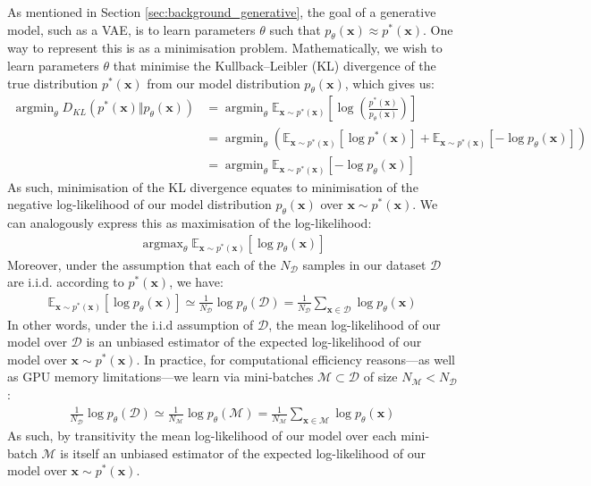 \documentclass[ oneside,%
                    author={George Herbert},
                    degree={MSci},
                     title={Video Diffusion Models for Climate Simulations},
                  subtitle={}]{dissertation}
\begin{document}
As mentioned in Section \ref{sec:background_generative}, the goal of a generative model, such as a VAE, is to learn parameters $\theta$ such that $p_\theta(\mathbf{x})\approx p^*(\mathbf{x})$. One way to represent this is as a minimisation problem. Mathematically, we wish to learn parameters $\theta$ that minimise the Kullback--Leibler (KL) divergence of the true distribution $p^*(\mathbf{x})$ from our model distribution $p_\theta(\mathbf{x})$, which gives us:
\begin{align}
      \operatorname{argmin}_{\theta} D_{KL}(p^*(\mathbf{x})\Vert p_\theta(\mathbf{x}))&=\operatorname{argmin}_{\theta}\mathbb{E}_{\mathbf{x}\sim p^*(\mathbf{x})}\left[\log\left(\frac{p^*(\mathbf{x})}{p_\theta(\mathbf{x})}\right)\right]\\
      &=\operatorname{argmin}_{\theta}\left(\mathbb{E}_{\mathbf{x}\sim p^*(\mathbf{x})}\left[\log p^*(\mathbf{x})\right]+\mathbb{E}_{\mathbf{x}\sim p^*(\mathbf{x})}\left[-\log p_\theta(\mathbf{x})\right]\right)\\
      &=\operatorname{argmin}_{\theta}\mathbb{E}_{\mathbf{x}\sim p^*(\mathbf{x})}\left[-\log p_\theta(\mathbf{x})\right]
\end{align}
As such, minimisation of the KL divergence equates to minimisation of the negative log-likelihood of our model distribution $p_\theta(\mathbf{x})$ over $\mathbf{x}\sim p^*(\mathbf{x})$. We can analogously express this as maximisation of the log-likelihood:
\begin{align}
      \operatorname{argmax}_{\theta}\mathbb{E}_{\mathbf{x}\sim p^*(\mathbf{x})}\left[\log p_\theta(\mathbf{x})\right]
\end{align}
Moreover, under the assumption that each of the $N_\mathcal{D}$ samples in our dataset $\mathcal{D}$ are i.i.d. according to $p^*(\mathbf{x})$, we have:
\begin{align}
      \mathbb{E}_{\mathbf{x}\sim p^*(\mathbf{x})}\left[\log p_\theta(\mathbf{x})\right]\simeq \frac{1}{N_{\mathcal{D}}}\log p_\theta(\mathcal{D}) = \frac{1}{N_{\mathcal{D}}} \sum_{\mathbf{x}\in\mathcal{D}} \log p_\theta(\mathbf{x})
\end{align}
In other words, under the i.i.d assumption of $\mathcal{D}$, the mean log-likelihood of our model over $\mathcal{D}$ is an unbiased estimator of the expected log-likelihood of our model over $\mathbf{x}\sim p^*(\mathbf{x})$. In practice, for computational efficiency reasons---as well as GPU memory limitations---we learn via mini-batches $\mathcal{M}\subset \mathcal{D}$ of size $N_\mathcal{M} < N_\mathcal{D}$:
\begin{align}
      \frac{1}{N_\mathcal{D}}\log p_\theta(\mathcal{D})\simeq \frac{1}{N_\mathcal{M}}\log p_\theta(\mathcal{M})=\frac{1}{N_\mathcal{M}}\sum_{\mathbf{x}\in\mathcal{M}}\log p_\theta(\mathbf{x})
\end{align}
As such, by transitivity the mean log-likelihood of our model over each mini-batch $\mathcal{M}$ is itself an unbiased estimator of the expected log-likelihood of our model over $\mathbf{x}\sim p^*(\mathbf{x})$.
\end{document}
